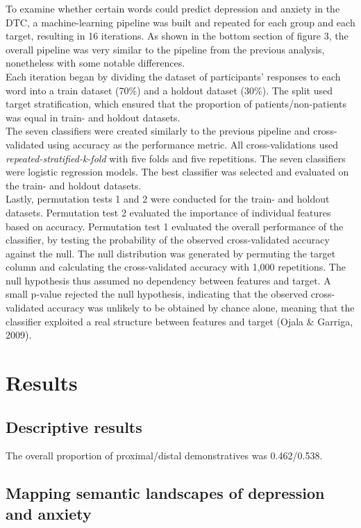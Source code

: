 \documentclass[11pt, a4paper]{article}
\begin{document}
To examine whether certain words could predict depression and anxiety in the DTC, a machine-learning pipeline was built and repeated for each group and each target, resulting in 16 iterations. As shown in the bottom section of figure 3, the overall pipeline was very similar to the pipeline from the previous analysis, nonetheless with some notable differences.\\
Each iteration began by dividing the dataset of participants’ responses to each word into a train dataset (70\%) and a holdout dataset (30\%). The split used target stratification, which ensured that the proportion of patients/non-patients was equal in train- and holdout datasets. \\
The seven classifiers were created similarly to the previous pipeline and cross-validated using accuracy as the performance metric. All cross-validations used \textit{repeated-stratified-k-fold} with five folds and five repetitions. The seven classifiers were logistic regression models. The best classifier was selected and evaluated on the train- and holdout datasets. \\

Lastly, permutation tests 1 and 2 were conducted for the train- and holdout datasets. Permutation test 2 evaluated the importance of individual features based on accuracy. Permutation test 1 evaluated the overall performance of the classifier, by testing the probability of the observed cross-validated accuracy against the null. The null distribution was generated by permuting the target column and calculating the cross-validated accuracy with 1,000 repetitions. The null hypothesis thus assumed no dependency between features and target. A small p-value rejected the null hypothesis, indicating that the observed cross-validated accuracy was unlikely to be obtained by chance alone, meaning that the classifier exploited a real structure between features and target (Ojala \& Garriga, 2009).

\section{Results}
\subsection{Descriptive results}
The overall proportion of proximal/distal demonstratives was 0.462/0.538.

\newpage

\subsection{Mapping semantic landscapes of depression and anxiety}
\end{document}
